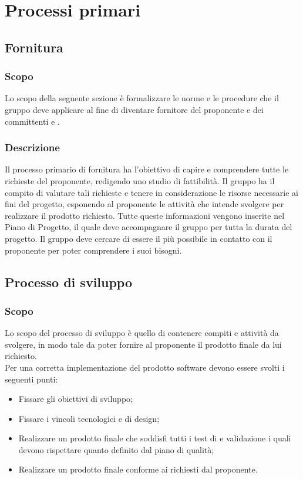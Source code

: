 \section{Processi primari}
\subsection{Fornitura}
\subsubsection{Scopo}
Lo scopo della seguente sezione è formalizzare le norme e le procedure che il gruppo \Gruppo{} deve applicare al fine di diventare fornitore del proponente \Proponente{} e dei committenti \VT{} e \CR{}.

\subsubsection{Descrizione} 
Il processo primario di fornitura ha l'obiettivo di capire e comprendere tutte le richieste del proponente, redigendo uno studio di fattibilità. 
Il gruppo \Gruppo{} ha il compito di valutare tali richieste e tenere in considerazione le risorse necessarie ai fini del progetto, esponendo al proponente \Proponente{} le attività che intende svolgere per realizzare il prodotto richiesto.
Tutte queste informazioni vengono inserite nel Piano di Progetto, il quale deve accompagnare il gruppo per tutta la durata del progetto.
Il gruppo \Gruppo{} deve cercare di essere il più possibile in contatto con il proponente per poter comprendere i suoi bisogni.



\subsection{Processo di sviluppo}
\subsubsection{Scopo}
Lo scopo del processo di sviluppo è quello di contenere compiti e attività da svolgere, in modo tale da poter fornire al proponente il prodotto finale da lui richiesto.\\
Per una corretta implementazione del prodotto software devono essere svolti i seguenti punti: 
\begin{itemize}
	\item Fissare gli obiettivi di sviluppo;
	\item Fissare i vincoli tecnologici e di design;
	\item Realizzare un prodotto finale che soddisfi tutti i test di  e validazione i quali devono rispettare quanto definito dal piano di qualità;
	\item Realizzare un prodotto finale conforme ai  richiesti dal proponente.
\end{itemize}
